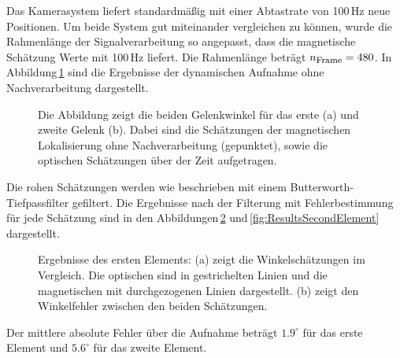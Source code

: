   Das Kamerasystem liefert standardmäßig mit einer Abtastrate von 100\,Hz neue Positionen. Um beide System gut miteinander vergleichen zu können, wurde die Rahmenlänge der Signalverarbeitung so angepasst, dass die magnetische Schätzung Werte mit 100\,Hz liefert. Die Rahmenlänge beträgt $n_{\textrm{\footnotesize{Frame}}}=480$. In Abbildung\,\ref{fig:RawResults} sind die Ergebnisse der dynamischen Aufnahme ohne Nachverarbeitung dargestellt. 
  \begin{figure}[h]
    \centering
    \vspace{0.1mm}
    \caption{Die Abbildung zeigt die beiden Gelenkwinkel für das erste (a) und zweite Gelenk (b). Dabei sind die Schätzungen der magnetischen Lokalisierung ohne Nachverarbeitung (gepunktet), sowie die optischen Schätzungen über der Zeit aufgetragen. }
    \label{fig:RawResults}
  \end{figure}
  Die rohen Schätzungen werden wie beschrieben mit einem Butterworth-Tiefpassfilter gefiltert. Die Ergebnisse nach der Filterung mit Fehlerbestimmung für jede Schätzung sind in den Abbildungen\,\ref{fig:ResultsFirstElement} und\,\ref{fig:ResultsSecondElement} dargestellt. 
  \begin{figure}[h]
    \centering
    \vspace{0.1mm}
    \caption{Ergebnisse des ersten Elements: (a) zeigt die Winkelschätzungen im Vergleich. Die optischen sind in gestrichelten Linien und die magnetischen mit durchgezogenen Linien dargestellt. (b) zeigt den Winkelfehler zwischen den beiden Schätzungen.}
    \label{fig:ResultsFirstElement}
  \end{figure}
  
  Der mittlere absolute Fehler über die Aufnahme beträgt $1.9^\circ$ für das erste Element und $5.6^\circ$ für das zweite Element.
  

